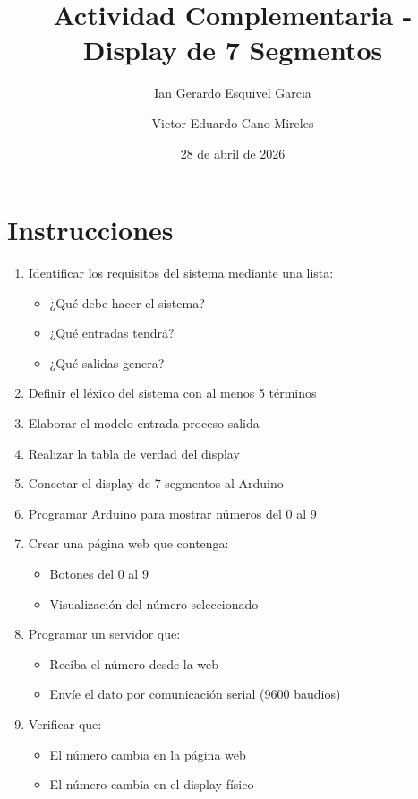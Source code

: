 \documentclass{article}
\title{Actividad Complementaria - Display de 7 Segmentos}
\author[1]{Ian Gerardo Esquivel Garcia}
\author[1]{Victor Eduardo Cano Mireles}
\affil[1]{Departamento de Ingeniería Eléctrica y Computación, Universidad Autónoma de Ciudad Juárez}
\date{28 de abril de 2026}
\begin{document}
\maketitle  


\newpage
\section{Instrucciones}
    \begin{enumerate}
        \item{Identificar los requisitos del sistema mediante una lista:}
            \begin{itemize}
                \item ¿Qué debe hacer el sistema? 
                \item ¿Qué entradas tendrá?
                \item ¿Qué salidas genera?
            \end{itemize}
        \item Definir el léxico del sistema con al menos 5 términos
        \item Elaborar el modelo entrada-proceso-salida
        \item Realizar la tabla de verdad del display
        \item Conectar el display de 7 segmentos al Arduino
        \item Programar Arduino para mostrar números del 0 al 9
        \item Crear una página web que contenga:
            \begin{itemize}
                \item Botones del 0 al 9
                \item Visualización del número seleccionado
            \end{itemize}
        \item Programar un servidor que:
            \begin{itemize}
                \item Reciba el número desde la web
                \item Envíe el dato por comunicación serial (9600 baudios)
            \end{itemize}
        \item Verificar que:
            \begin{itemize}
                \item El número cambia en la página web
                \item El número cambia en el display físico

\end{itemize}
\end{enumerate}
\end{document}
